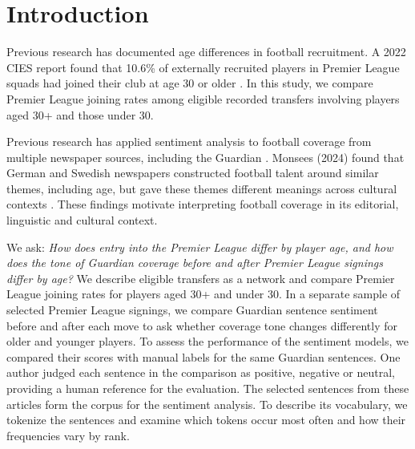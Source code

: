 \section*{Introduction}

Previous research has documented age differences in football recruitment. A 2022 CIES report found that 10.6\% of externally recruited players in Premier League squads had joined their club at age 30 or older \cite{poli2022recruitment}. In this study, we compare Premier League joining rates among eligible recorded transfers involving players aged 30+ and those under 30.

Previous research has applied sentiment analysis to football coverage from multiple newspaper sources, including the Guardian \cite{dotgrau2019representation}. Monsees (2024) found that German and Swedish newspapers constructed football talent around similar themes, including age, but gave these themes different meanings across cultural contexts \cite{monsees2024talent}. These findings motivate interpreting football coverage in its editorial, linguistic and cultural context.

We ask: \textit{How does entry into the Premier League differ by player age, and how does the tone of Guardian coverage before and after Premier League signings differ by age?} We describe eligible transfers as a network and compare Premier League joining rates for players aged 30+ and under 30. In a separate sample of selected Premier League signings, we compare Guardian sentence sentiment before and after each move to ask whether coverage tone changes differently for older and younger players. To assess the performance of the sentiment models, we compared their scores with manual labels for the same Guardian sentences. One author judged each sentence in the comparison as positive, negative or neutral, providing a human reference for the evaluation. The selected sentences from these articles form the corpus for the sentiment analysis. To describe its vocabulary, we tokenize the sentences and examine which tokens occur most often and how their frequencies vary by rank.
